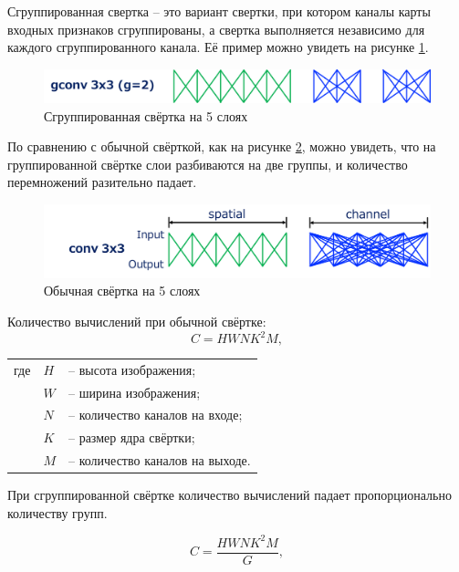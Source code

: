 Сгруппированная свертка -- это вариант свертки, при котором каналы карты входных признаков сгруппированы, а свертка выполняется независимо для каждого сгруппированного канала. Её пример можно увидеть на рисунке \ref{fig:gconv}.

\begin{figure}[ht]
    \centering
    \includegraphics[width=\textwidth*2/3]{images/gconv.png}
    \caption{Сгруппированная свёртка на 5 слоях}
    \label{fig:gconv}
\end{figure}

По сравнению с обычной свёрткой, как на рисунке \ref{fig:normal_conv}, можно увидеть, что на группированной свёртке слои разбиваются на две группы, и количество перемножений разительно падает.

\begin{figure}[ht]
    \centering
    \includegraphics[width=\textwidth*2/3]{images/normal_conv.png}
    \caption{Обычная свёртка на 5 слоях}
    \label{fig:normal_conv}
\end{figure}

Количество вычислений при обычной свёртке:
\begin{equation}
    C = HWNK^2M ,
\end{equation}
 
\noindent\begin{tabular}{l l l}
 где    & $H$ & -- высота изображения; \\
        & $W$ & -- ширина изображения; \\
        & $N$ & -- количество каналов на входе;\\
        & $K$ & -- размер ядра свёртки;\\
        & $M$ & -- количество каналов на выходе.\\
\end{tabular}
\newline

При сгруппированной свёртке количество вычислений падает пропорционально количеству групп.

\begin{equation}
    C = \dfrac{HWNK^2M}{G} ,
\end{equation}

